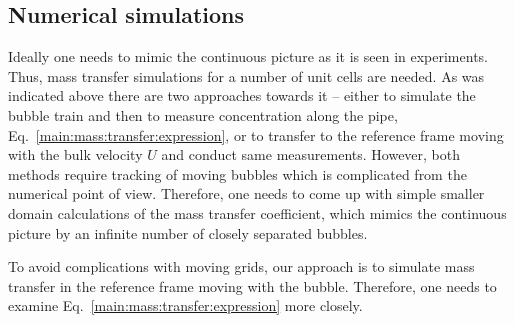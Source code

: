 \documentclass{article}
\begin{document}
\subsection{Numerical simulations}
\label{section:cases}
Ideally one needs to mimic the continuous picture as it is seen in experiments.
Thus, mass transfer simulations for a number of unit cells are needed. As was
indicated above there are two approaches towards it -- either to simulate the
bubble train and then to measure concentration along the pipe, Eq.~\ref{main:mass:transfer:expression},
or to transfer to the reference frame moving with the bulk
velocity $U$ and conduct same measurements. However, both methods require tracking of
moving bubbles which is complicated from the numerical point of view. Therefore, one needs to come
up with simple smaller domain calculations of the mass transfer coefficient, which mimics the
continuous picture by an infinite number of closely separated bubbles. 

To avoid complications with moving grids, our
approach is to simulate mass transfer in the reference frame moving with the bubble. Therefore, one
needs to examine  Eq.~\ref{main:mass:transfer:expression} more closely. 
\end{document}
